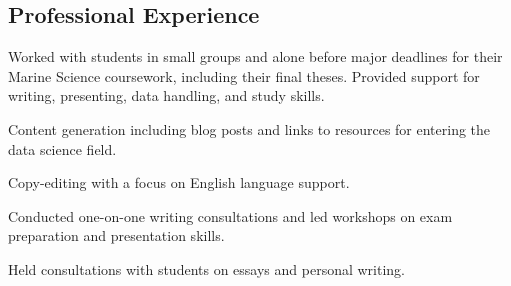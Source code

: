 \documentclass[a4paper]{deedy-resume} %
\begin{document}
\begin{flushleft}


\section{Professional Experience}



Worked with students in small groups and alone before major deadlines for their Marine Science coursework, including their final theses. Provided support for writing, presenting, data handling, and study skills.

\sectionspace


Content generation including blog posts and links to resources for entering the data science field.

\sectionspace



Copy-editing with a focus on English language support.

\sectionspace



Conducted one-on-one writing consultations and led workshops on exam preparation and presentation skills.

\sectionspace %



Held consultations with students on essays and personal writing.


\end{flushleft}
\end{document}
